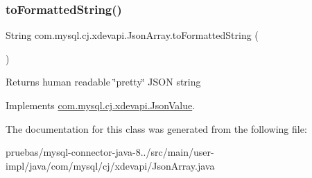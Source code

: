 \subsubsection{\texorpdfstring{to\+Formatted\+String()}{toFormattedString()}}
{\footnotesize\ttfamily String com.\+mysql.\+cj.\+xdevapi.\+Json\+Array.\+to\+Formatted\+String (\begin{DoxyParamCaption}{ }\end{DoxyParamCaption})}

\begin{DoxyReturn}{Returns}
human readable \char`\"{}pretty\char`\"{} J\+S\+ON string 
\end{DoxyReturn}


Implements \mbox{\hyperlink{interfacecom_1_1mysql_1_1cj_1_1xdevapi_1_1_json_value_aed42bf9ff63b3cd329cb1fabcf9dfe41}{com.\+mysql.\+cj.\+xdevapi.\+Json\+Value}}.



The documentation for this class was generated from the following file\+:\begin{DoxyCompactItemize}
\item 
pruebas/mysql-\/connector-\/java-\/8../src/main/user-\/impl/java/com/mysql/cj/xdevapi/Json\+Array.\+java\end{DoxyCompactItemize}
